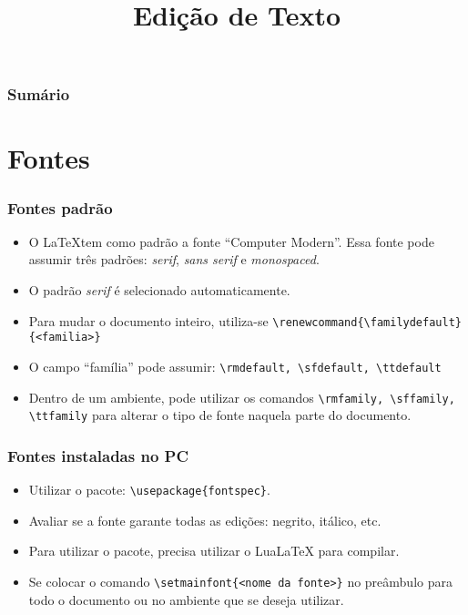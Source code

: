 \documentclass[brazilian]{beamer}
\title{Edição de Texto}
\begin{document}
\frame{\titlepage}

\begin{frame}
    \frametitle{Sumário}
    \tableofcontents
\end{frame}

\section{Fontes}
\begin{frame}[fragile]
    \frametitle{Fontes padrão}

    \begin{itemize}
        \item O \LaTeX tem como padrão a fonte ``Computer Modern''. Essa fonte pode assumir três padrões: \textit{serif}, \textit{sans serif} e \textit{monospaced}.
        \item O padrão \textit{serif} é selecionado automaticamente.
        \item Para mudar o documento inteiro, utiliza-se \lstinline[style=myStyleLatex]!\renewcommand{\familydefault}{<familia>}!
        \item O campo ``família'' pode assumir: \lstinline[style=myStyleLatex]!\rmdefault, \sfdefault, \ttdefault!
        \item Dentro de um ambiente, pode utilizar os comandos \lstinline[style=myStyleLatex]!\rmfamily, \sffamily, \ttfamily! para alterar o tipo de fonte naquela parte do documento.
    \end{itemize}

\end{frame}

\begin{frame}[fragile]
    \frametitle{Fontes instaladas no PC}

    \begin{itemize}
        \item Utilizar o pacote: \lstinline[style=myStyleLatex]!\usepackage{fontspec}!.
        \item Avaliar se a fonte garante todas as edições: negrito, itálico, etc.
        \item Para utilizar o pacote, precisa utilizar o LuaLaTeX para compilar.
        \item Se colocar o comando \lstinline[style=myStyleLatex]!\setmainfont{<nome da fonte>}! no preâmbulo para todo o documento ou no ambiente que se deseja utilizar.
    \end{itemize}

\end{frame}
\end{document}
